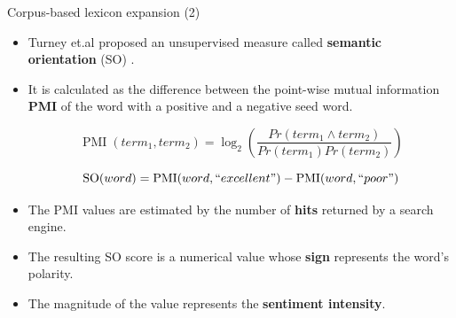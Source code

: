 \documentclass[handout]{beamer}
\begin{document}
\begin{frame}{Corpus-based lexicon expansion (2)}
\begin{scriptsize}
\begin{itemize}
\item Turney et.al proposed an unsupervised measure called \textbf{semantic orientation} (SO) \cite{turney2003measuring} .
\item It is calculated as the difference between the point-wise mutual information \textbf{PMI} of the word with a positive and a negative seed word.

\begin{equation}
 \operatorname{PMI}(term_{1}, term_{2})= \log_{2} \left ( \frac{Pr(term_{1} \wedge term_{2})}{Pr(term_{1})Pr(term_{2})} \right )
\end{equation}

\begin{equation}\label{eq:so}
 \operatorname{SO}(word) = \operatorname{PMI}(word, ``excellent") - \operatorname{PMI}(word, ``poor")
\end{equation}

\item The PMI values are estimated by the number of \textbf{hits} returned by a search engine.

\item The resulting SO score is a numerical value whose \textbf{sign} represents the word's polarity.

\item The magnitude of the value represents the \textbf{sentiment intensity}. 


\end{itemize}
\end{scriptsize}
\end{frame}
\end{document}

